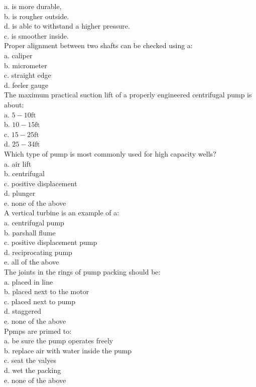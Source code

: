 a. is more durable,\\
b. is rougher outside.\\
d. is able to withstand a higher pressure.\\
c. is smoother inside.\\
Proper alignment between two shafts can be checked using a:\\
a. caliper\\
b. micrometer\\
c. straight edge\\
d. feeler gauge\\
The maximum practical suction lift of a properly engineered centrifugal pump is about:\\
a. $5-10 \mathrm{ft}$\\
b. $10-15 \mathrm{ft}$\\
c. $15-25 \mathrm{ft}$\\
d. $25-34 \mathrm{ft}$ \\
Which type of pump is most commonly used for high capacity wells?\\
a. air lift\\
b. centrifugal\\
c. positive displacement\\
d. plunger\\
e. none of the above\\
A vertical turbine is an example of a:\\
a. centrifugal pump\\
b. parshall flume\\
c. positive displacement pump\\
d. reciprocating pump\\
e. all of the above\\
The joints in the rings of pump packing should be:\\
a. placed in line\\
b. placed next to the motor\\
c. placed next to pump\\
d. staggered\\
e. none of the above\\
Ppmps are primed to:\\
a. be sure the pump operates freely\\
b. replace air with water inside the pump\\
c. seat the valyes\\
d. wet the packing\\
e. none of the above\\
